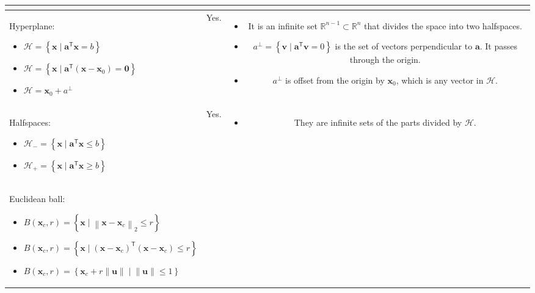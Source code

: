\documentclass{article}
\newcommand{\trans}{\mathsf{T}}
\newcommand\norm[1]{\left\lVert#1\right\rVert}
\begin{document}
\begin{table}
\begin{tabularx}{\textwidth}{|A|B|C|}
\begin{itemize}[leftmargin=*]
\end{itemize}\\
\hline
Hyperplane:
\begin{itemize}[leftmargin=*]
    \item \( \mathcal{H} = \left\{ \mathbf{x} \mid \mathbf{a}^\trans \mathbf{x} = b \right\}\)
    \item \(\mathcal{H} = \left\{ \mathbf{x} \mid \mathbf{a}^\trans (\mathbf{x} - \mathbf{x}_{0}) = \mathbf{0} \right\}\)
    \item \(\mathcal{H} = \mathbf{x}_0 + a^{\perp} \)
\end{itemize} & Yes. &
\begin{itemize}[leftmargin=*]
    \item It is an infinite set \(\mathbb{R}^{n-1} \subset \mathbb{R}^{n}\) that divides the space into two halfspaces.
    \item \(a^{\perp} = \left\{ \mathbf{v} \mid \mathbf{a}^\trans \mathbf{v} = 0 \right\}\) is the set of vectors perpendicular to \(\mathbf{a}\). It passes through the origin.
    \item \(a^{\perp}\) is offset from the origin by \(\mathbf{x}_0\), which is any vector in \(\mathcal{H}\).
\end{itemize} \\
\hline
Halfspaces:
\begin{itemize}[leftmargin=*]
    \item \(\mathcal{H}_{-} = \left\{ \mathbf{x} \mid \mathbf{a}^\trans \mathbf{x} \leq b \right\}\)
    \item \(\mathcal{H}_{+} = \left\{ \mathbf{x} \mid \mathbf{a}^\trans \mathbf{x} \geq b \right\}\)
\end{itemize} & Yes. &
\begin{itemize}[leftmargin=*]
    \item They are infinite sets of the parts divided by \(\mathcal{H}\).
\end{itemize}\\
\hline
Euclidean ball:
\begin{itemize}[leftmargin=*]
    \item \(B(\mathbf{x}_c, r) = \left\{ \mathbf{x} \mid \norm{\mathbf{x}-\mathbf{x}_c}_2 \leq r \right\}\)
    \item \(B(\mathbf{x}_c, r) = \left\{ \mathbf{x} \mid \left( \mathbf{x}-\mathbf{x}_c \right)^\trans \left( \mathbf{x}-\mathbf{x}_c \right) \leq r \right\}\)
    \item \(B(\mathbf{x}_c, r) = \left\{ \mathbf{x}_c + r \norm{\mathbf{u}} \mid \norm{\mathbf{u}} \leq 1 \right\}\)

\end{itemize}
\end{tabularx}
\end{table}
\end{document}
